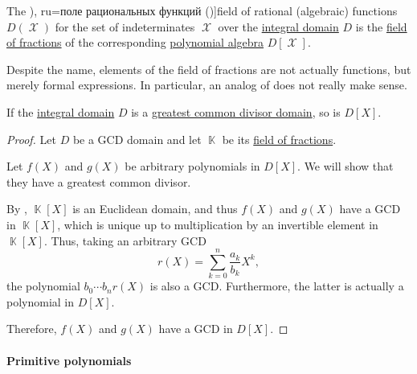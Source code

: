 \begin{definition}\label{def:rational_function_field}
  The \term[bg=поле на рационалните функции (\cite[360]{ГеновМиховскиМоллов1991Алгебра}), ru=поле рациональных функций (\cite[18]{Шафаревич1999ОсновныеПонятияАлгебры})]{field of rational (algebraic) functions} \( D(\mscrX) \) for the set of indeterminates \( \mscrX \) over the \hyperref[def:integral_domain]{integral domain} \( D \) is the \hyperref[def:field_of_fractions]{field of fractions} of the corresponding \hyperref[def:polynomial_algebra]{polynomial algebra} \( D[\mscrX] \).
\end{definition}
\begin{comments}
  \item Despite the name, elements of the field of fractions are not actually functions, but merely formal expressions. In particular, an analog of  does not really make sense.
\end{comments}

\begin{proposition}\label{thm:polynomial_ring_over_gcd_domain}
  If the \hyperref[def:integral_domain]{integral domain} \( D \) is a \hyperref[def:gcd_domain]{greatest common divisor domain}, so is \( D[X] \).
\end{proposition}
\begin{proof}
  Let \( D \) be a GCD domain and let \( \BbbK \) be its \hyperref[def:field_of_fractions]{field of fractions}.

  Let \( f(X) \) and \( g(X) \) be arbitrary polynomials in \( D[X] \). We will show that they have a greatest common divisor.

  By , \( \BbbK[X] \) is an Euclidean domain, and thus \( f(X) \) and \( g(X) \) have a GCD in \( \BbbK[X] \), which is unique up to multiplication by an invertible element in \( \BbbK[X] \). Thus, taking an arbitrary GCD
  \begin{equation*}
    r(X) = \sum_{k=0}^n \frac {a_k} {b_k} X^k,
  \end{equation*}
  the polynomial \( b_0 \cdots b_n r(X) \) is also a GCD. Furthermore, the latter is actually a polynomial in \( D[X] \).

  Therefore, \( f(X) \) and \( g(X) \) have a GCD in \( D[X] \).
\end{proof}

\paragraph{Primitive polynomials}

